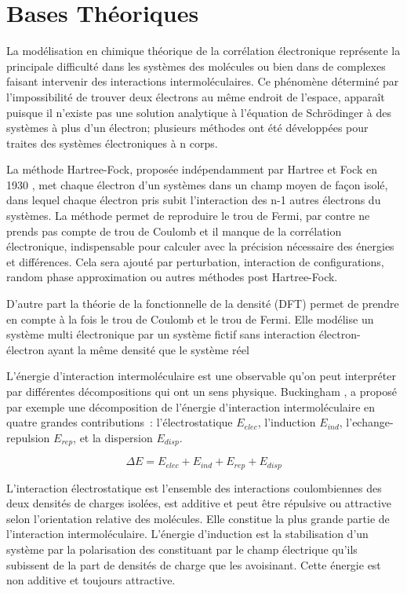 \section{Bases Théoriques}

La modélisation en chimique théorique de la corrélation électronique représente la principale difficulté dans les systèmes des molécules ou bien dans de complexes faisant intervenir des interactions intermoléculaires. Ce phénomène déterminé par l’impossibilité de trouver deux électrons au même endroit de l’espace, apparaît puisque il n’existe pas une solution analytique à l’équation de  Schrödinger à des systèmes à plus d’un électron; plusieurs méthodes ont été développées pour traites des systèmes électroniques à n corps.

La méthode Hartree-Fock, proposée indépendamment par Hartree et Fock en 1930 \cite{slater1930note}, met chaque électron d’un systèmes dans un champ moyen de façon isolé, dans lequel chaque électron pris subit l’interaction des n-1 autres électrons du systèmes. La méthode permet de reproduire le trou de Fermi, par contre ne prends pas compte de trou de Coulomb et il manque de la corrélation électronique, indispensable pour calculer avec la précision nécessaire des énergies et différences. Cela sera ajouté par perturbation, interaction de configurations, random phase approximation ou autres méthodes post Hartree-Fock.

D'autre part la théorie de la fonctionnelle de la densité (DFT) permet de prendre en compte à la fois le trou de Coulomb et le trou de Fermi. Elle modélise un système multi électronique par un système fictif sans interaction électron- électron  ayant la même densité que le système réel

L’énergie d’interaction intermoléculaire est une observable qu’on peut interpréter par différentes décompositions qui ont un sens physique. Buckingham \cite{buckingham1967permanent}, a proposé par exemple une décomposition de l’énergie d’interaction intermoléculaire en quatre grandes contributions : l’électrostatique $E_{elec}$, l’induction $E_{ind}$, l’echange-repulsion $E_{rep}$, et la dispersion $E_{disp}$.

\begin{equation}
\Delta E = E_{elec} + E_{ind} + E_{rep} + E_{disp}
\end{equation} 

L’interaction électrostatique est l’ensemble des interactions coulombiennes des deux densités de charges isolées, est additive et peut être répulsive ou attractive selon l’orientation relative des molécules. Elle constitue la plus grande partie de l’interaction intermoléculaire.  
L’énergie d’induction est la stabilisation d’un système par la polarisation des constituant par le champ électrique qu’ils subissent de la part de densités de charge que les avoisinant. Cette énergie est non additive et toujours attractive.

